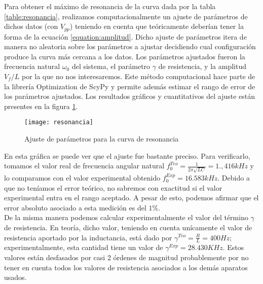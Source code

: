 \documentclass[%
 reprint,
 amsmath,amssymb,
 aps,
]{revtex4-1}
\begin{document}
Para obtener el máximo de resonancia de la curva dada por la tabla \ref{table:resonancia}, realizamos computacionalmente un ajuste de parámetros de dichos datos (con $V_{pp}$) teniendo en cuenta que te\'oricamente deber\'ian tener la forma de la ecuaci\'on \ref{equation:amplitud}. Dicho ajuste de parámetros itera de manera no aleatoria sobre los par\'ametros a ajustar decidiendo cual configuraci\'on produce la curva m\'as cercana a los datos. Los par\'ametros ajustados fueron la frecuencia natural $\omega_0$ del sistema, el par\'ametro $\gamma$ de resistencia, y la amplitud $V_f/L$ por la que no nos interesaremos. Este m\'etodo computacional hace parte de la librer\'ia Optimization de ScyPy y permite adem\'as estimar el rango de error de los par\'ametros ajustados. Los resultados gr\'aficos y cuantitativos del ajuste est\'an presentes en la figura \ref{fig:resonancia}.\\

\begin{figure}[h]
\caption{Ajuste de parámetros para la curva de resonancia}
\centering
\texttt{[image: resonancia]}
\label{fig:resonancia}
\end{figure}

En esta gráfica se puede ver que el ajuste fue bastante preciso. Para verificarlo, tomamos el valor real de frecuencia angular natural $f_0^{Teo} = \frac{1}{2\pi \sqrt{LC}} = 1.,416kHz$ y lo comparamos con el valor experimental obtenido  $f_0^{Exp} = 16.583kHz$. Debido a que no teníamos el error teórico, no sabremos con exactitud si el valor experimental entra en el rango aceptado. A pesar de esto, podemos afirmar que el error absoluto asociado a esta medición es del $1\%$.\\

De la misma manera podemos calcular experimentalmente el valor del t\'ermino $\gamma$ de resistencia. En teoría, dicho valor, teniendo en cuenta un\'icamente el valor de resistencia aportado por la inductancia, est\'a dado por $\gamma^{Teo} = \frac{R}{L} = 400Hz$; experimentalmente, esta cantidad tiene un valor de $\gamma^{Exp} = 28.430KHz$. Estos valores están desfasados por casi 2 \'ordenes de magnitud probablemente por no tener en cuenta todos los valores de resistencia asociados a los dem\'as aparatos usados.\\
\end{document}

